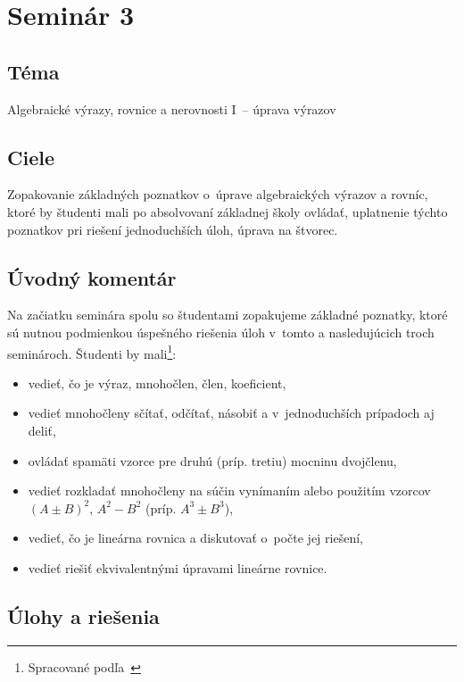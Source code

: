 \section*{Seminár 3}

\subsection*{Téma}
Algebraické výrazy, rovnice a nerovnosti I~-- úprava výrazov

\subsection*{Ciele}
Zopakovanie základných poznatkov o~úprave algebraických výrazov a rovníc, ktoré by študenti mali po absolvovaní základnej školy ovládať, uplatnenie týchto poznatkov pri riešení jednoduchších úloh, úprava na štvorec.

\subsection*{Úvodný komentár}
Na začiatku seminára spolu so študentami zopakujeme základné poznatky, ktoré sú nutnou podmienkou úspešného riešenia úloh v~tomto a nasledujúcich troch seminároch.
Študenti by mali\footnote{Spracované podľa~\cite{Kubat2000}}:
\begin{itemize}
\item vedieť, čo je výraz, mnohočlen, člen, koeficient,
\item vedieť mnohočleny sčítať, odčítať, násobiť a v~jednoduchších prípadoch aj deliť,
\item ovládať spamäti vzorce pre druhú (príp. tretiu) mocninu dvojčlenu,
\item vedieť rozkladať mnohočleny na súčin vynímaním alebo použitím vzorcov $(A\pm B)^2$, $A^2-B^2$ (príp. $A^3\pm B^3$),
\item vedieť, čo je lineárna rovnica a diskutovať o~počte jej riešení,
\item vedieť riešiť ekvivalentnými úpravami lineárne rovnice.\\
\end{itemize}

\subsection*{Úlohy a riešenia}





